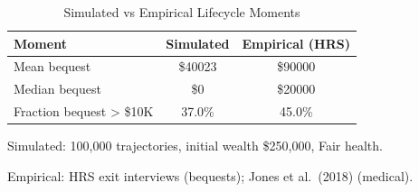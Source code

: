 \begin{table}[htbp]
\centering
\caption{Simulated vs Empirical Lifecycle Moments}
\label{tab:moment_validation}
\begin{tabular}{lcc}
\toprule
Moment & Simulated & Empirical (HRS) \\
\midrule
Mean bequest & \$40023 & \$90000 \\
Median bequest & \$0 & \$20000 \\
Fraction bequest > \$10K & 37.0\% & 45.0\% \\
\bottomrule
\end{tabular}
\begin{tablenotes}
\small
\item Simulated: 100,000 trajectories, initial wealth \$250,000, Fair health.
\item Empirical: HRS exit interviews (bequests); Jones et al.\ (2018) (medical).
\end{tablenotes}
\end{table}
